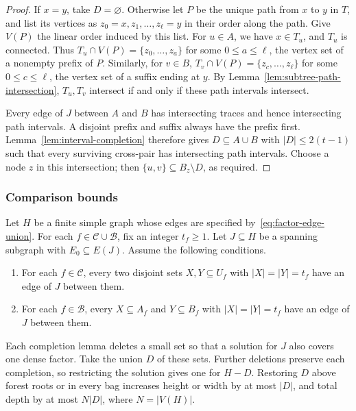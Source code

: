 \begin{proof}
If $x=y$, take $D=\varnothing$. Otherwise let $P$ be the unique
path from $x$ to $y$ in $T$, and list its vertices as
$z_0=x,z_1,\ldots,z_\ell=y$ in their order along the path.
Give $V(P)$ the linear order induced by this list. For $u\in A$,
we have $x\in T_u$, and $T_u$ is connected. Thus
$T_u\cap V(P)=\{z_0,\ldots,z_a\}$ for some $0\leq a\leq\ell$,
the vertex set of a nonempty prefix of $P$. Similarly, for $v\in B$,
$T_v\cap V(P)=\{z_c,\ldots,z_\ell\}$ for some $0\leq c\leq\ell$,
the vertex set of a suffix ending at $y$.
By Lemma~\ref{lem:subtree-path-intersection}, $T_u,T_v$ intersect if and only if these
path intervals intersect.

Every edge of $J$ between $A$ and $B$ has intersecting traces and
hence intersecting path intervals. A disjoint prefix and suffix
always have the prefix first. Lemma~\ref{lem:interval-completion}
therefore gives $D\subseteq A\cup B$ with $|D|\le2(t-1)$ such that
every surviving cross-pair has intersecting path intervals. Choose
a node $z$ in this intersection; then
$\{u,v\}\subseteq B_z\setminus D$, as required.
\end{proof}

\subsubsection{Comparison bounds}

\begin{definition}
\label{def:factor-comparison}
Let $H$ be a finite simple graph whose edges are specified
by~\eqref{eq:factor-edge-union}. For each
$f\in\mathcal C\cup\mathcal B$, fix an integer $t_f\ge1$.
Let $J\subseteq H$ be a spanning subgraph with $E_0\subseteq E(J)$.
Assume the following conditions.
\begin{enumerate}
 \item For each $f\in\mathcal C$, every two disjoint sets
   $X,Y\subseteq U_f$ with $|X|=|Y|=t_f$ have an edge of $J$
   between them.
 \item For each $f\in\mathcal B$, every $X\subseteq A_f$ and
   $Y\subseteq B_f$ with $|X|=|Y|=t_f$ have an edge of $J$
   between them.
\end{enumerate}
\end{definition}

Each completion lemma deletes a small set so that a solution for
$J$ also covers one dense factor. Take the union $D$ of these sets.
Further deletions preserve each completion, so restricting the
solution gives one for $H-D$. Restoring $D$ above forest roots or
in every bag increases height or width by at most $|D|$, and total
depth by at most $N|D|$, where $N=|V(H)|$.

